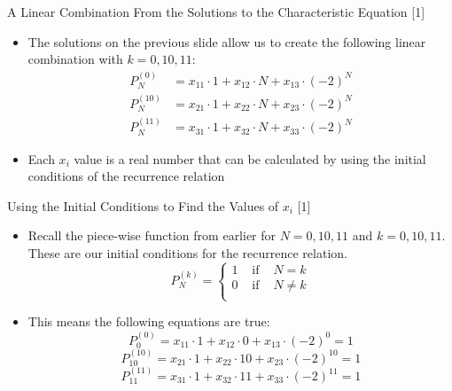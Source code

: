 \documentclass[14pt]{beamer}
\begin{document}
\begin{frame}{A Linear Combination From the Solutions to the Characteristic Equation [1]}
 \begin{itemize}
     \item The solutions on the previous slide allow us to create the following linear combination with $k=0,10,11$:
     \begin{align}
        P^{(0)}_N &= x_{11} \cdot 1 + x_{12} \cdot N + x_{13} \cdot (-2)^N \\
        P^{(10)}_N &= x_{21} \cdot 1 + x_{22} \cdot N + x_{23} \cdot (-2)^N \\
        P^{(11)}_N &= x_{31} \cdot 1 + x_{32} \cdot N + x_{33} \cdot (-2)^N
     \end{align}
     \item Each $x_i$ value is a real number that can be calculated by using the initial conditions of the recurrence relation
 \end{itemize} 
\end{frame}

\begin{frame}{Using the Initial Conditions to Find the Values of $x_i$ [1]}
 \begin{itemize}
     \item Recall the piece-wise function from earlier for $N=0,10,11$ and $k=0,10,11$. These are our initial conditions for the recurrence relation.
        $$P^{(k)}_N = 
        \left\{
        \begin{array}{ccc}
        1 & \text{ if } & N = k \\
        0 & \text{ if } & N \neq k \\
        \end{array}
        \right.$$
     \item This means the following equations are true:
     $$P^{(0)}_{0} = x_{11} \cdot 1 + x_{12} \cdot 0 + x_{13} \cdot (-2)^{0}
        = 1$$
     $$P^{(10)}_{10} = x_{21} \cdot 1 + x_{22} \cdot 10 + x_{23} \cdot (-2)^{10}
        = 1$$
     $$P^{(11)}_{11} = x_{31} \cdot 1 + x_{32} \cdot 11 + x_{33} \cdot (-2)^{11} 
        = 1$$
 \end{itemize}  
\end{frame}
\end{document}
